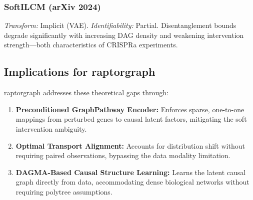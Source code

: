\subsubsection{SoftILCM (arXiv 2024)}
\textit{Transform:} Implicit (VAE). \textit{Identifiability:} Partial.
Disentanglement bounds degrade significantly with increasing DAG density and
weakening intervention strength---both characteristics of CRISPRa experiments.


\subsection{Implications for \gls{raptorgraph}}
\label{app:crl_methods:raptorgraph}

\gls{raptorgraph} addresses these theoretical gaps through:

\begin{enumerate}
    \item \textbf{Preconditioned GraphPathway Encoder:} Enforces sparse,
          one-to-one mappings from perturbed genes to causal latent factors,
          mitigating the soft intervention ambiguity.
    \item \textbf{Optimal Transport Alignment:} Accounts for distribution shift
          without requiring paired observations, bypassing the data modality
          limitation.
    \item \textbf{DAGMA-Based Causal Structure Learning:} Learns the latent
          causal graph directly from data, accommodating dense biological
          networks without requiring polytree assumptions.
\end{enumerate}

